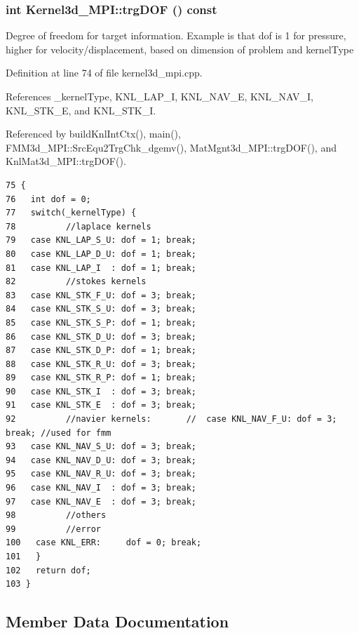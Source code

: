 \subsubsection{\setlength{\rightskip}{0pt plus 5cm}int Kernel3d\_\-MPI::trg\-DOF () const}\label{classKernel3d__MPI_0d7423b81a78e2a050a8658d3d46cb9c_0d7423b81a78e2a050a8658d3d46cb9c}


Degree of freedom for target information. Example is that dof is 1 for pressure, higher for velocity/displacement, based on dimension of problem and kernel\-Type 

Definition at line 74 of file kernel3d\_\-mpi.cpp.

References \_\-kernel\-Type, KNL\_\-LAP\_\-I, KNL\_\-NAV\_\-E, KNL\_\-NAV\_\-I, KNL\_\-STK\_\-E, and KNL\_\-STK\_\-I.

Referenced by build\-Knl\-Int\-Ctx(), main(), FMM3d\_\-MPI::Src\-Equ2Trg\-Chk\_\-dgemv(), Mat\-Mgnt3d\_\-MPI::trg\-DOF(), and Knl\-Mat3d\_\-MPI::trg\-DOF().

\footnotesize\begin{verbatim}75 {
76   int dof = 0;
77   switch(_kernelType) {
78          //laplace kernels
79   case KNL_LAP_S_U: dof = 1; break;
80   case KNL_LAP_D_U: dof = 1; break;
81   case KNL_LAP_I  : dof = 1; break;
82          //stokes kernels
83   case KNL_STK_F_U: dof = 3; break;
84   case KNL_STK_S_U: dof = 3; break;
85   case KNL_STK_S_P: dof = 1; break;
86   case KNL_STK_D_U: dof = 3; break;
87   case KNL_STK_D_P: dof = 1; break;
88   case KNL_STK_R_U: dof = 3; break;
89   case KNL_STK_R_P: dof = 1; break;
90   case KNL_STK_I  : dof = 3; break;
91   case KNL_STK_E  : dof = 3; break;
92          //navier kernels:       //  case KNL_NAV_F_U: dof = 3; break; //used for fmm
93   case KNL_NAV_S_U: dof = 3; break;
94   case KNL_NAV_D_U: dof = 3; break;
95   case KNL_NAV_R_U: dof = 3; break;
96   case KNL_NAV_I  : dof = 3; break;
97   case KNL_NAV_E  : dof = 3; break;
98          //others
99          //error
100   case KNL_ERR:     dof = 0; break;
101   }
102   return dof;
103 }
\end{verbatim}\normalsize 




\subsection{Member Data Documentation}
